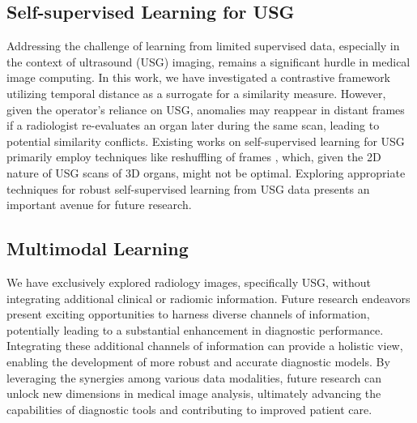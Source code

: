 \subsection{Self-supervised Learning for USG}
%
Addressing the challenge of learning from limited supervised data, especially in the context of ultrasound (USG) imaging, remains a significant hurdle in medical image computing. In this work, we have investigated a contrastive framework utilizing temporal distance as a surrogate for a similarity measure. However, given the operator's reliance on USG, anomalies may reappear in distant frames if a radiologist re-evaluates an organ later during the same scan, leading to potential similarity conflicts. Existing works on self-supervised learning for USG primarily employ techniques like reshuffling of frames \cite{reshuff}, which, given the 2D nature of USG scans of 3D organs, might not be optimal. Exploring appropriate techniques for robust self-supervised learning from USG data presents an important avenue for future research.

\subsection{Multimodal Learning}
%
We have exclusively explored radiology images, specifically USG, without integrating additional clinical or radiomic information. Future research endeavors present exciting opportunities to harness diverse channels of information, potentially leading to a substantial enhancement in diagnostic performance.
Integrating these additional channels of information can provide a holistic view, enabling the development of more robust and accurate diagnostic models. By leveraging the synergies among various data modalities, future research can unlock new dimensions in medical image analysis, ultimately advancing the capabilities of diagnostic tools and contributing to improved patient care.


